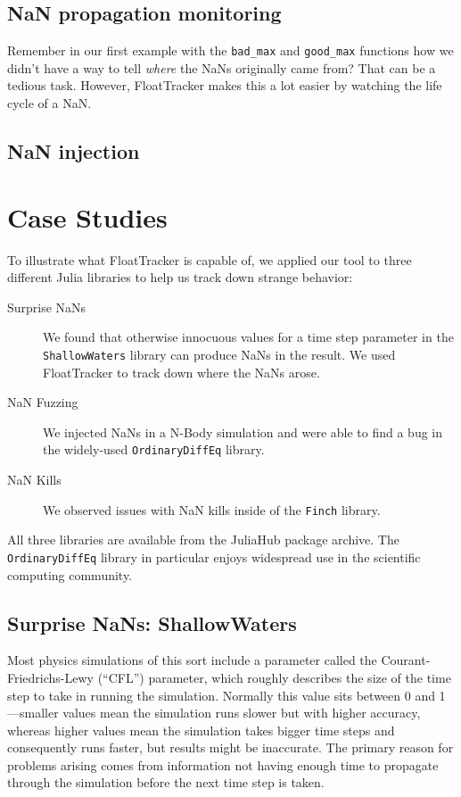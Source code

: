 \documentclass{juliacon}
\begin{document}
\subsection{NaN propagation monitoring}

Remember in our first example with the \texttt{bad\_max} and \texttt{good\_max} functions how we didn't have a way to tell \emph{where} the NaNs originally came from?
That can be a tedious task.
However, FloatTracker makes this a lot easier by watching the life cycle of a NaN.


\subsection{NaN injection}

\section{Case Studies}

To illustrate what FloatTracker is capable of, we applied our tool to three different Julia libraries to help us track down strange behavior:

\begin{description}
\item[Surprise NaNs] We found that otherwise innocuous values for a time step parameter in the \texttt{ShallowWaters} library can produce NaNs in the result.
  We used FloatTracker to track down where the NaNs arose.
\item[NaN Fuzzing] We injected NaNs in a N-Body simulation and were able to find a bug in the widely-used \texttt{OrdinaryDiffEq} library.
\item[NaN Kills] We observed issues with NaN kills inside of the \texttt{Finch} library.
\end{description}

All three libraries are available from the JuliaHub package archive.
The \texttt{OrdinaryDiffEq} library in particular enjoys widespread use in the scientific computing community.

\subsection{Surprise NaNs: ShallowWaters}

Most physics simulations of this sort include a parameter called the Courant-Friedrichs-Lewy (``CFL'') parameter, which roughly describes the size of the time step to take in running the simulation.
Normally this value sits between 0 and 1---smaller values mean the simulation runs slower but with higher accuracy, whereas higher values mean the simulation takes bigger time steps and consequently runs faster, but results might be inaccurate.
The primary reason for problems arising comes from information not having enough time to propagate through the simulation before the next time step is taken.
\end{document}

